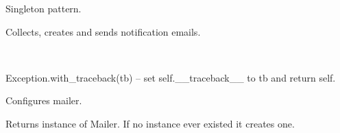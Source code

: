 \documentclass[letterpaper,10pt,english]{sphinxmanual}
\begin{document}
\begin{fulllineitems}
\label{index:spy.Mailer}
Singleton pattern.

Collects, creates and sends notification emails.

\begin{fulllineitems}
\label{index:spy.Mailer.NotSingle}~

\begin{fulllineitems}
\label{index:spy.Mailer.NotSingle.args}
\end{fulllineitems}


\begin{fulllineitems}
\label{index:spy.Mailer.NotSingle.with_traceback}
Exception.with\_traceback(tb) --
set self.\_\_traceback\_\_ to tb and return self.

\end{fulllineitems}


\end{fulllineitems}


\begin{fulllineitems}
\label{index:spy.Mailer._Mailer__instance}
\end{fulllineitems}


\begin{fulllineitems}
\label{index:spy.Mailer.configure}
Configures mailer.

\end{fulllineitems}


\begin{fulllineitems}
\label{index:spy.Mailer.get_instance}
Returns instance of Mailer.
If no instance ever existed it creates one.


\end{fulllineitems}
\end{fulllineitems}
\end{document}
